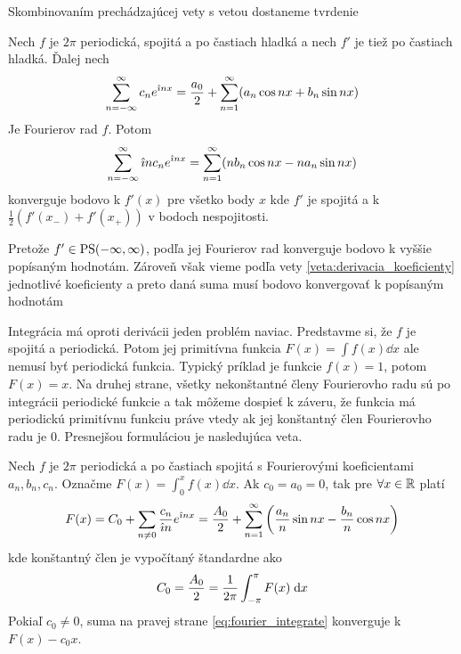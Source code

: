 Skombinovaním prechádzajúcej vety s vetou 
dostaneme tvrdenie
\begin{veta}
    Nech $f$ je $2\pi$ periodická, spojitá a po častiach hladká a nech
    $f'$ je tiež po častiach hladká. Ďalej nech    
    \begin{equation}
        \sum_{n=-\infty}^{\infty} c_n e^{\hat{\imath} n x} = 
         \frac{a_0}{2} + \sum_{n=1}^{\infty} (
            a_n \cos n x + b_n \sin n x)        
    \end{equation}
    Je Fourierov rad $f$.
    Potom
    \begin{equation}
        \sum_{n=-\infty}^{\infty} \hat{\imath} n c_n e^{\hat{\imath} n x} = 
         \sum_{n=1}^{\infty} (
            n b_n \cos n x - n a_n \sin n x)        
    \end{equation}
    konverguje bodovo k $f'(x)$ pre všetko body $x$ kde $f'$ je
    spojitá a k $\frac{1}{2}(f'(x_-) + f'(x_+) )$ v bodoch
    nespojitosti.
    \label{veta:fourier_derivacia}
\end{veta}

\begin{dokaz}
  Pretože $f'\in \mbox{PS}(-\infty,\infty)$, podľa  jej Fourierov rad
  konverguje bodovo k vyššie popísaným hodnotám. Zároveň však vieme
  podľa vety \ref{veta:derivacia_koeficienty} jednotlivé koeficienty
  a preto daná suma musí bodovo konvergovať k popísaným hodnotám
\end{dokaz}

Integrácia má oproti derivácii jeden problém naviac.
Predstavme si, že $f$ je spojitá a periodická. Potom jej primitívna
funkcia
$F(x) = \int f(x) \dd x$ ale nemusí byť periodická funkcia.
Typický príklad je funkcie $f(x)=1$, potom $F(x)=x$. Na druhej strane,
 všetky nekonštantné členy Fourierovho radu sú po integrácii
 periodické funkcie a tak môžeme dospieť k záveru, že funkcia má
 periodickú primitívnu funkciu práve vtedy ak jej konštantný člen
 Fourierovho radu je 0. Presnejšou formuláciou je nasledujúca veta.

\begin{veta}
    Nech $f$ je $2\pi$ periodická a po častiach spojitá s Fourierovými
    koeficientami $a_n,b_n,c_n$. Označme
    $F(x) = \int_{0}^{x} f(x) \dd x$. Ak $c_0 = a_0 =0$, tak 
    pre $\forall x\in {\mathbb R}$ platí
    \begin{equation}
        F(x) = C_0 + \sum_{n\not=0} \frac{c_n}{\hat{\imath} n} e^{\hat{\imath} n x}
        = \frac{A_0}{2} + \sum_{n=1}^{\infty} \left(
                \frac{a_n}{n} \sin nx - \frac{b_n}{n} \cos nx\right)
    \label{eq:fourier_integrate}
    \end{equation}
    kde konštantný člen je vypočítaný štandardne ako 
    \begin{equation}
        C_0 = \frac{A_0}{2} = \frac{1}{2\pi} \int_{-\pi}^{\pi} F(x) \; \mathrm{d} x
    \end{equation}
    Pokiaľ $c_0\not=0$, suma na pravej strane
    \ref{eq:fourier_integrate} konverguje k $F(x) - c_0 x$.
    \label{veta:fourier_integrovanie}
\end{veta}

